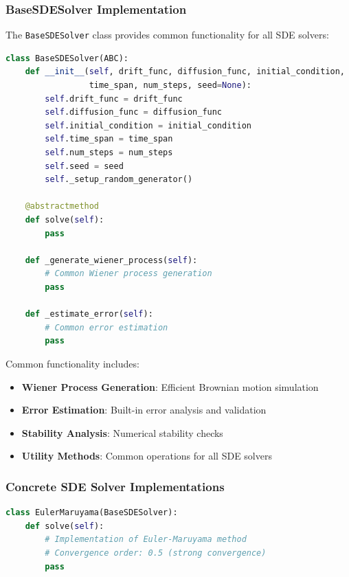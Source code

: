 \subsubsection{BaseSDESolver Implementation}

The \texttt{BaseSDESolver} class provides common functionality for all SDE solvers:

\begin{lstlisting}[language=Python, caption=BaseSDESolver Base Class]
class BaseSDESolver(ABC):
    def __init__(self, drift_func, diffusion_func, initial_condition,
                 time_span, num_steps, seed=None):
        self.drift_func = drift_func
        self.diffusion_func = diffusion_func
        self.initial_condition = initial_condition
        self.time_span = time_span
        self.num_steps = num_steps
        self.seed = seed
        self._setup_random_generator()
    
    @abstractmethod
    def solve(self):
        pass
    
    def _generate_wiener_process(self):
        # Common Wiener process generation
        pass
    
    def _estimate_error(self):
        # Common error estimation
        pass
\end{lstlisting}

Common functionality includes:
\begin{itemize}
    \item \textbf{Wiener Process Generation}: Efficient Brownian motion simulation
    \item \textbf{Error Estimation}: Built-in error analysis and validation
    \item \textbf{Stability Analysis}: Numerical stability checks
    \item \textbf{Utility Methods}: Common operations for all SDE solvers
\end{itemize}

\subsubsection{Concrete SDE Solver Implementations}

\begin{lstlisting}[language=Python, caption=EulerMaruyama Implementation]
class EulerMaruyama(BaseSDESolver):
    def solve(self):
        # Implementation of Euler-Maruyama method
        # Convergence order: 0.5 (strong convergence)
        pass
\end{lstlisting}

